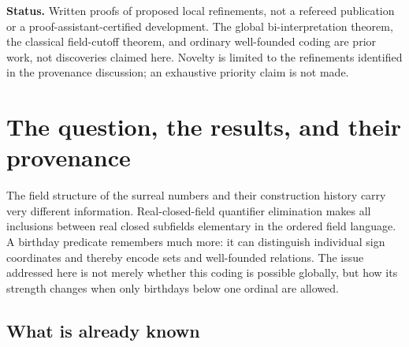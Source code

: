 \documentclass[11pt,letterpaper]{article}
\theoremstyle{definition}
\theoremstyle{remark}
\newcommand{\B}{\mathcal B}
\begin{document}
\begin{titlepage}
\begin{minipage}{0.92\textwidth}
\begin{abstract}
The resulting elementary-inclusion classification is sharp: for epsilon
numbers $\lambda<\eta$, the inclusion $\B_\lambda\prec\B_\eta$ holds exactly
when both cutoffs are cardinals and $H_\lambda\prec H_\eta$. We also calibrate
two explicit growth principles: birthday eternity corresponds to Replacement
at cardinal cutoffs, while packing birthday fibers corresponds to the strong
limit property. Their conjunction selects precisely the worldly cardinal
cutoffs. Finally we give a power-set-sized detector for new subsets in outer
models, prove extension rigidity at strong-limit cutoffs, and explain the
orientation obstruction to bi-interpretation for surcomplex numbers.
\end{abstract}
\end{minipage}
\vfill
\begin{minipage}{0.92\textwidth}\small
\textbf{Status.} Written proofs of proposed local refinements, not a refereed
publication or a proof-assistant-certified development. The global
bi-interpretation theorem, the classical field-cutoff theorem, and ordinary
well-founded coding are prior work, not discoveries claimed here. Novelty is
limited to the refinements identified in the provenance discussion; an
exhaustive priority claim is not made.
\end{minipage}
\end{titlepage}
\tableofcontents
\clearpage{}

\section{The question, the results, and their provenance}
\label{sec:intro}

The field structure of the surreal numbers and their construction history
carry very different information. Real-closed-field quantifier elimination
makes all inclusions between real closed subfields elementary in the ordered
field language. A birthday predicate remembers much more: it can distinguish
individual sign coordinates and thereby encode sets and well-founded
relations. The issue addressed here is not merely whether this coding is
possible globally, but how its strength changes when only birthdays below one
ordinal are allowed.

\subsection{What is already known}
\end{document}
